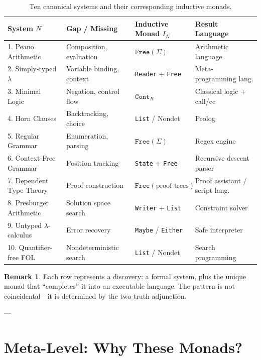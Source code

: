 \documentclass[a4paper,11pt]{article}
\theoremstyle{definition}
\newtheorem{remark}{Remark}[section]
\begin{document}
\begin{table}[h!]
\centering
\small
\begin{tabularx}{\linewidth}{l >{\raggedright\arraybackslash}X l >{\raggedright\arraybackslash}X}
\toprule
\textbf{System } $N$ & \textbf{Gap / Missing} & \textbf{Inductive Monad } $I_N$ & \textbf{Result Language} \\
\midrule
1. Peano Arithmetic & Composition, evaluation & $\texttt{Free}(\Sigma)$ & Arithmetic language \\
2. Simply-typed $\lambda$ & Variable binding, context & \texttt{Reader} + \texttt{Free} & Meta-programming lang. \\
3. Minimal Logic & Negation, control flow & $\texttt{Cont}_R$ & Classical logic + call/cc \\
4. Horn Clauses & Backtracking, choice & \texttt{List} / Nondet & Prolog \\
5. Regular Grammar & Enumeration, parsing & $\texttt{Free}(\Sigma)$ & Regex engine \\
6. Context-Free Grammar & Position tracking & \texttt{State} + \texttt{Free} & Recursive descent parser \\
7. Dependent Type Theory & Proof construction & $\texttt{Free}(\text{proof trees})$ & Proof assistant / script lang. \\
8. Presburger Arithmetic & Solution space search & \texttt{Writer} + \texttt{List} & Constraint solver \\
9. Untyped $\lambda$-calculus & Error recovery & \texttt{Maybe} / \texttt{Either} & Safe interpreter \\
10. Quantifier-free FOL & Nondeterministic search & \texttt{List} / Nondet & Search programming \\
\bottomrule
\end{tabularx}
\caption{Ten canonical systems and their corresponding inductive monads.}
\label{tab:correspondence}
\end{table}

\begin{remark}
Each row represents a discovery: a formal system, plus the unique monad that ``completes'' it into an executable language. The pattern is not coincidental—it is determined by the two-truth adjunction.
\end{remark}

---

\section{Meta-Level: Why These Monads?}
\end{document}
